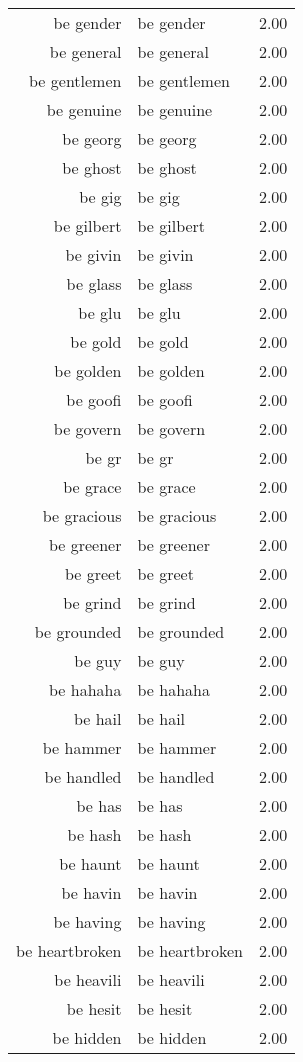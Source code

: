 \begin{table}[ht]
\begin{tabular}{rlr}
  be gender & be gender & 2.00 \\ 
  be general & be general & 2.00 \\ 
  be gentlemen & be gentlemen & 2.00 \\ 
  be genuine & be genuine & 2.00 \\ 
  be georg & be georg & 2.00 \\ 
  be ghost & be ghost & 2.00 \\ 
  be gig & be gig & 2.00 \\ 
  be gilbert & be gilbert & 2.00 \\ 
  be givin & be givin & 2.00 \\ 
  be glass & be glass & 2.00 \\ 
  be glu & be glu & 2.00 \\ 
  be gold & be gold & 2.00 \\ 
  be golden & be golden & 2.00 \\ 
  be goofi & be goofi & 2.00 \\ 
  be govern & be govern & 2.00 \\ 
  be gr & be gr & 2.00 \\ 
  be grace & be grace & 2.00 \\ 
  be gracious & be gracious & 2.00 \\ 
  be greener & be greener & 2.00 \\ 
  be greet & be greet & 2.00 \\ 
  be grind & be grind & 2.00 \\ 
  be grounded & be grounded & 2.00 \\ 
  be guy & be guy & 2.00 \\ 
  be hahaha & be hahaha & 2.00 \\ 
  be hail & be hail & 2.00 \\ 
  be hammer & be hammer & 2.00 \\ 
  be handled & be handled & 2.00 \\ 
  be has & be has & 2.00 \\ 
  be hash & be hash & 2.00 \\ 
  be haunt & be haunt & 2.00 \\ 
  be havin & be havin & 2.00 \\ 
  be having & be having & 2.00 \\ 
  be heartbroken & be heartbroken & 2.00 \\ 
  be heavili & be heavili & 2.00 \\ 
  be hesit & be hesit & 2.00 \\ 
  be hidden & be hidden & 2.00 \\ 

\end{tabular}
\end{table}
